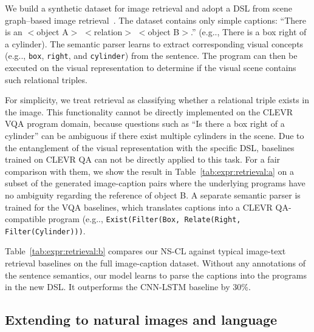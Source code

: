 \documentclass{article} \usepackage{iclr2019_conference,times}
\makeatletter
\newcommand{\tbl}[1]{Table~\ref{#1}}
\DeclareRobustCommand\onedot{\futurelet\@let@token\@onedot}
\def\@onedot{\ifx\@let@token.\else.\null\fi\xspace}
\def\eg{e.g\onedot} \def\Eg{E.g\onedot}
\newcommand{\model}{NS-CL\xspace}
\makeatother
\begin{document}
We build a synthetic dataset for image retrieval and adopt a DSL from scene graph--based image retrieval~\citep{Johnson2015Image}. The dataset contains only simple captions: ``There is an $<$object A$>$ $<$relation$>$ $<$object B$>$.'' (\eg, There is a box right of a cylinder). The semantic parser learns to extract corresponding visual concepts (\eg, \texttt{box}, \texttt{right}, and \texttt{cylinder}) from the sentence. The program can then be executed on the visual representation to determine if the visual scene contains such relational triples.

For simplicity, we treat retrieval as classifying whether a relational triple exists in the image. This functionality cannot be directly implemented on the CLEVR VQA program domain, because questions such as ``Is there a box right of a cylinder'' can be ambiguous if there exist multiple cylinders in the scene. Due to the entanglement of the visual representation with the specific DSL, baselines trained on CLEVR QA can not be directly applied to this task. For a fair comparison with them, we show the result in \tbl{tab:expr:retrieval:a} on a subset of the generated image-caption pairs where the underlying programs have no ambiguity regarding the reference of object B. A separate semantic parser is trained for the VQA baselines, which translates captions into a CLEVR QA-compatible program (\eg, \texttt{Exist(Filter(Box, Relate(Right, Filter(Cylinder)))}.

\tbl{tab:expr:retrieval:b} compares our \model against typical image-text retrieval baselines on the full image-caption dataset. Without any annotations of the sentence semantics, our model learns to parse the captions into the programs in the new DSL. It outperforms the CNN-LSTM baseline by 30\%. 


\subsection{Extending to natural images and language}
\end{document}
